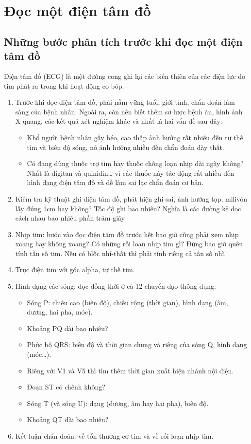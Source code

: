 \section{Đọc một điện tâm đồ}
\subsection{Những bước phân tích trước khi đọc một điện tâm đồ}
Điện tâm đồ (ECG) là một đường cong ghi lại các biến thiên của các điện lực do tim phát ra trong khi hoạt động co bóp.\cite{huongdanDTT}

\begin{enumerate}
    \item Trước khi đọc điện tâm đồ, phải nắm vững tuổi, giới tính, chẩn đoán lâm sàng của bệnh
    nhân. Ngoài ra, còn nên biết thêm sơ lược bệnh án, hình ảnh X quang, các kết quả xét nghiệm khác và nhất là hai vấn đề sau đây:
    \begin{itemize}
        \item Khổ người bệnh nhân gầy béo, cao thấp ảnh hưởng rất nhiều đến tư thế tìm và biên độ sóng, nó ảnh hưởng nhiều đến chẩn đoán dày thất.
        \item Có đang dùng thuốc trợ tim hay thuốc chống loạn nhịp dài ngày không? Nhất là digitan và quinidin… vì các thuốc này tác động rất nhiều đến hình dạng điện tâm đồ và dễ làm sai lạc chẩn đoán cơ bản.
    \end{itemize}
    \item Kiểm tra kỹ thuật ghi điện tâm đồ, phát hiện ghi sai, ảnh hưởng tạp, milivôn lấy đúng 1cm
    hay không? Tốc độ ghi bao nhiêu? Nghĩa là các đường kẻ dọc cách nhau bao nhiêu phần trăm
    giây
    \item Nhịp tim: bước vào đọc điện tâm đồ trước hết bao giờ cũng phải xem nhịp xoang hay
    không xoang? Có những rối loạn nhịp tim gì? Đừng bao giờ quên tính tần số tim. Nếu có blốc
    nhĩ-thất thì phải tính riêng cả tần số nhĩ.
    \item Trục điện tim với góc alpha, tư thế tim.
    \item Hình dạng các sóng: đọc đồng thời ở cả 12 chuyển đạo thông dụng:
    \begin{itemize}
        \item Sóng P: chiều cao (biên độ), chiều rộng (thời gian), hình dạng (âm, dương, hai pha, móc).
        \item Khoảng PQ dài bao nhiêu?
        \item Phức bộ QRS: biên độ và thời gian chung và riêng của sóng Q, hình dạng (móc…).
        \item Riêng với V1 và V5 thì tìm thêm thời gian xuất hiện nhánh nội điện.
        \item Đoạn ST có chênh không?
        \item Sóng T (và sóng U): dạng (dương, âm hay hai pha), biên độ.
        \item Khoảng QT dài bao nhiêu?
    \end{itemize}
    \item Kết luận chẩn đoán: về tổn thương cơ tim và về rối loạn nhịp tim.
\end{enumerate}

